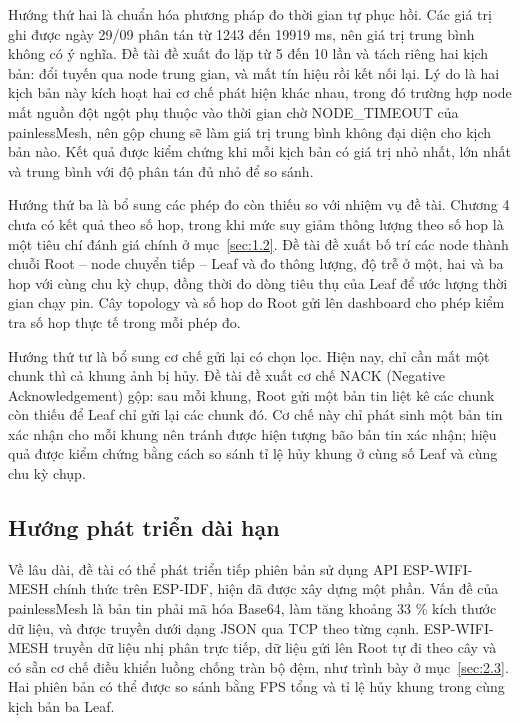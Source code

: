 Hướng thứ hai là chuẩn hóa phương pháp đo thời gian tự phục hồi. Các giá trị ghi được ngày 29/09 phân tán từ 1243 đến 19919 ms, nên giá trị trung bình không có ý nghĩa. Đề tài đề xuất đo lặp từ 5 đến 10 lần và tách riêng hai kịch bản: đổi tuyến qua node trung gian, và mất tín hiệu rồi kết nối lại. Lý do là hai kịch bản này kích hoạt hai cơ chế phát hiện khác nhau, trong đó trường hợp node mất nguồn đột ngột phụ thuộc vào thời gian chờ NODE\_TIMEOUT của painlessMesh, nên gộp chung sẽ làm giá trị trung bình không đại diện cho kịch bản nào. Kết quả được kiểm chứng khi mỗi kịch bản có giá trị nhỏ nhất, lớn nhất và trung bình với độ phân tán đủ nhỏ để so sánh.

Hướng thứ ba là bổ sung các phép đo còn thiếu so với nhiệm vụ đề tài. Chương 4 chưa có kết quả theo số hop, trong khi mức suy giảm thông lượng theo số hop là một tiêu chí đánh giá chính ở mục~\ref{sec:1.2}. Đề tài đề xuất bố trí các node thành chuỗi Root – node chuyển tiếp – Leaf và đo thông lượng, độ trễ ở một, hai và ba hop với cùng chu kỳ chụp, đồng thời đo dòng tiêu thụ của Leaf để ước lượng thời gian chạy pin. Cây topology và số hop do Root gửi lên dashboard cho phép kiểm tra số hop thực tế trong mỗi phép đo.

Hướng thứ tư là bổ sung cơ chế gửi lại có chọn lọc. Hiện nay, chỉ cần mất một chunk thì cả khung ảnh bị hủy. Đề tài đề xuất cơ chế NACK (Negative Acknowledgement) gộp: sau mỗi khung, Root gửi một bản tin liệt kê các chunk còn thiếu để Leaf chỉ gửi lại các chunk đó. Cơ chế này chỉ phát sinh một bản tin xác nhận cho mỗi khung nên tránh được hiện tượng bão bản tin xác nhận; hiệu quả được kiểm chứng bằng cách so sánh tỉ lệ hủy khung ở cùng số Leaf và cùng chu kỳ chụp.

\subsection{Hướng phát triển dài hạn}

Về lâu dài, đề tài có thể phát triển tiếp phiên bản sử dụng API ESP-WIFI-MESH chính thức trên ESP-IDF, hiện đã được xây dựng một phần. Vấn đề của painlessMesh là bản tin phải mã hóa Base64, làm tăng khoảng 33 \% kích thước dữ liệu, và được truyền dưới dạng JSON qua TCP theo từng cạnh. ESP-WIFI-MESH truyền dữ liệu nhị phân trực tiếp, dữ liệu gửi lên Root tự đi theo cây và có sẵn cơ chế điều khiển luồng chống tràn bộ đệm, như trình bày ở mục~\ref{sec:2.3}. Hai phiên bản có thể được so sánh bằng FPS tổng và tỉ lệ hủy khung trong cùng kịch bản ba Leaf.

